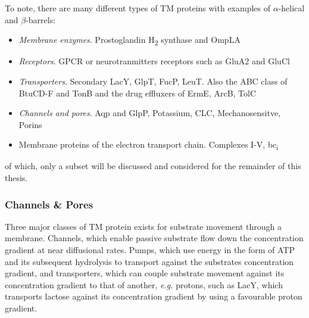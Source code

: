 To note, there are many different types of TM proteins with examples of $\alpha$-helical and $\beta$-barrels: 
\begin{itemize}
\item \textit{Membrane enzymes}. Prostoglandin H\textsubscript{2} synthase and OmpLA
\item \textit{Receptors}.  GPCR or neurotranmitters receptors such as GluA2 and GluCl
\item \textit{Transporters}. Secondary LacY, GlpT, FucP, LeuT. Also the ABC class of BtuCD-F and TonB and the drug effluxers of ErmE, ArcB, TolC
\item \textit{Channels and pores}. Aqp and GlpP, Potassium, CLC, Mechanosensitve, Porins
\item {Membrane proteins of the electron transport chain}. Complexes I-V, bc\textsubscript{i}
\end{itemize}

of which, only a subset will be discussed and considered for the remainder of this thesis. 

\newpage

\subsubsection*{Channels \& Pores}

Three major classes of TM protein exists for substrate movement through a membrane. Channels, which enable passive substrate flow down the concentration gradient at near diffusional rates. Pumps, which use energy in the form of ATP and its subsequent hydrolysis to transport against the substrates concentration gradient, and transporters, which can couple substrate movement against its concentration gradient to that of another, \textit{e.g.} protons, such as LacY, which transports lactose against its concentration gradient by using a favourable proton gradient. 

